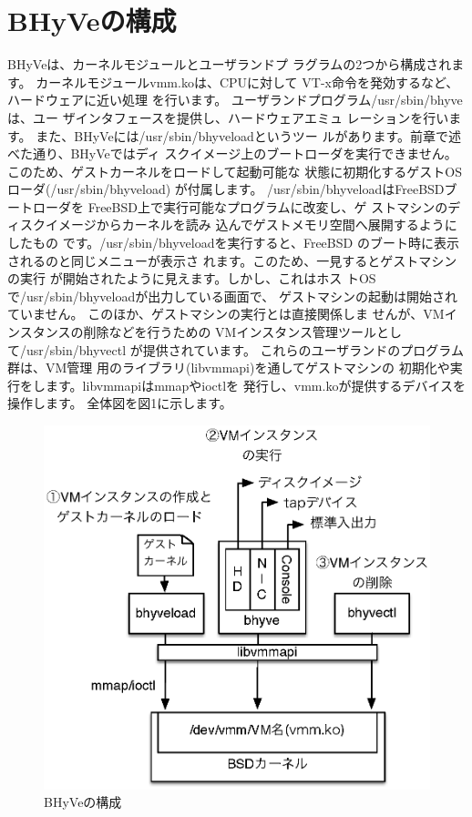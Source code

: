 \section{BHyVeの構成}

 BHyVeは、カーネルモジュールとユーザランドプ
ラグラムの2つから構成されます。
 カーネルモジュールvmm.koは、CPUに対して
VT-x命令を発効するなど、ハードウェアに近い処理
を行います。
 ユーザランドプログラム/usr/sbin/bhyveは、ユー
ザインタフェースを提供し、ハードウェアエミュ
レーションを行います。
 また、BHyVeには/usr/sbin/bhyveloadというツー
ルがあります。前章で述べた通り、BHyVeではディ
スクイメージ上のブートローダを実行できません。
このため、ゲストカーネルをロードして起動可能な
状態に初期化するゲストOSローダ(/usr/sbin/bhyveload)
が付属します。
 /usr/sbin/bhyveloadはFreeBSDブートローダを
FreeBSD上で実行可能なプログラムに改変し、ゲ
ストマシンのディスクイメージからカーネルを読み
込んでゲストメモリ空間へ展開するようにしたもの
です。/usr/sbin/bhyveloadを実行すると、FreeBSD
のブート時に表示されるのと同じメニューが表示さ
れます。このため、一見するとゲストマシンの実行
が開始されたように見えます。しかし、これはホス
トOSで/usr/sbin/bhyveloadが出力している画面で、
ゲストマシンの起動は開始されていません。
 このほか、ゲストマシンの実行とは直接関係しま
せんが、VMインスタンスの削除などを行うための
VMインスタンス管理ツールとして/usr/sbin/bhyvectl
が提供されています。
 これらのユーザランドのプログラム群は、VM管理
用のライブラリ(libvmmapi)を通してゲストマシンの
初期化や実行をします。libvmmapiはmmapやioctlを
発行し、vmm.koが提供するデバイスを操作します。
 全体図を図1に示します。

\begin{figure}
 \includegraphics{figures/part6_fig1_BHyVe_overview.eps}
 \caption{BHyVeの構成}
 \label{fig1}
\end{figure}

